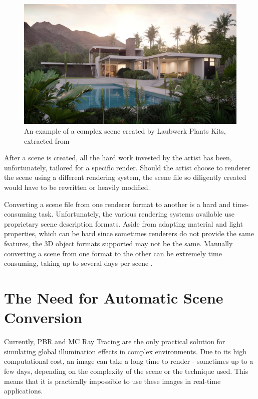 \begin{figure}[h]
  
\includegraphics[width=\textwidth,height=\textheight,keepaspectratio]{images/1_introduction/Laubwerk-Kit-12_Bauclassroom-Exterior.jpg}
  \caption{An example of a complex scene created by Laubwerk Plants Kits, extracted from \cite{laubwerk}}
  \label{fig:intro_complexScene}
\end{figure}

After a scene is created, all the hard work invested by the artist has been, unfortunately, tailored for a specific render. 
Should the artist choose to renderer the scene using a different rendering system, the scene file so diligently created would have to be 
rewritten or heavily modified.

Converting a scene file from one renderer format to another is a hard and time-consuming task. Unfortunately, the various rendering systems available use proprietary scene description formats. Aside from adapting material and light properties, which can be hard since sometimes renderers do not provide the same features, the 3D object formats supported may not be the same. Manually converting a scene from one format to the other can be extremely time consuming, taking up to several days per scene \cite{tungsten}.


\section{The Need for Automatic Scene Conversion}

Currently, PBR and MC Ray Tracing are the only practical solution for simulating global illumination effects in complex environments. Due to its high computational cost, an image can take a long time to render - sometimes up to a few days, depending on the complexity of the scene or the technique used. This means that it is practically impossible to use these images in real-time applications.

